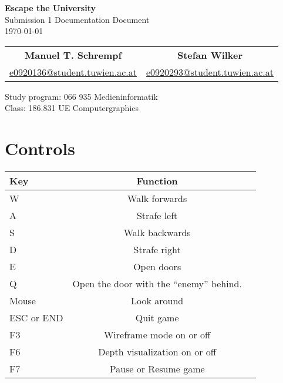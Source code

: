 \documentclass[12pt]{article}
\begin{document}
\begin{titlepage}
 \vspace*{8cm}
\begin{center}
 \textbf{\Huge Escape the University} \\
  \vspace{3mm}
 {\Large Submission 1 Documentation Document\\
  \vspace{3mm}  
  \today}
 \vspace{5mm}
\begin{table}[h!]
  \centering
  \begin{tabular}{c c}
	\textbf{Manuel T. Schrempf}  &   \textbf{Stefan Wilker}\\
	\href{mailto:e0920136@student.tuwien.ac.at}{e0920136@student.tuwien.ac.at}&
	\href{mailto:e0920293@student.tuwien.ac.at}{e0920293@student.tuwien.ac.at}\\
  \end{tabular}
\end{table}

 \vspace{3mm}
{\large Study program: 066 935 Medieninformatik\\
 \vspace{2mm}
Class: 186.831 UE Computergraphics}
\end{center}
\end{titlepage}
\tableofcontents %
\newpage
\pagestyle{plain}
\setcounter{page}{1}

\section{Controls \label{Controls}} 

\begin{table}[h!]
  \centering
  \label{table1}
  \begin{tabular}{p{3cm} c c}
Key & Function\\
    \hline
W & Walk forwards	\\
A & Strafe left \\
S & Walk backwards \\
D & Strafe right \\
E & Open doors\\
Q & Open the door with the ``enemy'' behind.\\

Mouse & Look around\\

 ESC or END & Quit game \\
 F3 & Wireframe mode on or off \\
 F6 & Depth visualization on or off\\ %
 F7 & Pause or Resume game \\
  \end{tabular}
\end{table}
\end{document}
